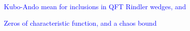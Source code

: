 \documentclass[a4paper,11pt]{article}
\theoremstyle{definition}
\theoremstyle{remark}
\newcommand{\nn}{\nonumber}
\newcommand{\lb}{\left(}
\newcommand{\rb}{\right)}
\newcommand{\NL}[1]{\textcolor{blue}{#1}}
\begin{document}
\NL{Kubo-Ando mean for inclusions in QFT Rindler wedges, and }

\NL{Zeros of characteristic function, and a chaos bound}









\end{document}
